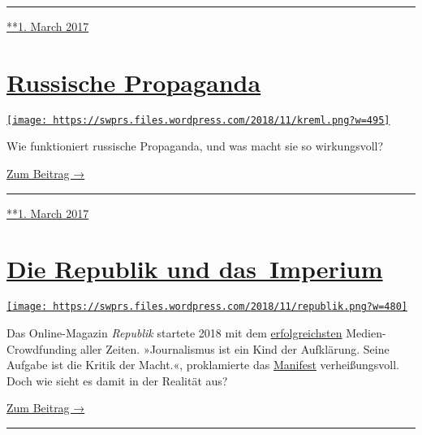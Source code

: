 \begin{center}\rule{0.5\linewidth}{\linethickness}\end{center}

\href{https://swprs.org/2017/03/01/netzwerk-medien-usa/}{**1. March
2017}

\hypertarget{russische-propaganda}{%
\section{\texorpdfstring{\href{https://swprs.org/2017/03/01/russische-propaganda/}{Russische
Propaganda}}{Russische Propaganda}}\label{russische-propaganda}}

\href{https://swprs.org/2017/03/01/russische-propaganda/}{\texttt{[image: https://swprs.files.wordpress.com/2018/11/kreml.png?w=495]}}

Wie funktioniert russische Propaganda, und was macht sie so
wirkungs­voll?

\href{https://swprs.org/russische-propaganda/}{Zum Beitrag →}

\begin{center}\rule{0.5\linewidth}{\linethickness}\end{center}

\href{https://swprs.org/2017/03/01/russische-propaganda/}{**1. March
2017}

\hypertarget{die-republik-und-das-imperium}{%
\section{\texorpdfstring{\href{https://swprs.org/2017/03/01/die-republik-und-das-imperium/}{Die
Republik und
das~Imperium}}{Die Republik und das~Imperium}}\label{die-republik-und-das-imperium}}

\href{https://swprs.org/2017/03/01/die-republik-und-das-imperium/}{\texttt{[image: https://swprs.files.wordpress.com/2018/11/republik.png?w=480]}}

Das Online-Magazin \emph{Republik} startete 2018 mit dem
\href{https://www.persoenlich.com/medien/weltrekord-fur-journalistisches-crowdfunding-gebrochen}{erfolgreichsten}
Medien-Crowdfunding aller Zeiten. »Journalismus ist ein Kind der
Aufklä­rung. Seine Aufgabe ist die Kritik der Macht.«, proklamierte das
\href{https://www.republik.ch/manifest}{Manifest} verheißungsvoll. Doch
wie sieht es damit in der Realität aus?

\href{https://swprs.org/die-republik-und-das-imperium/}{Zum Beitrag →}

\begin{center}\rule{0.5\linewidth}{\linethickness}\end{center}

